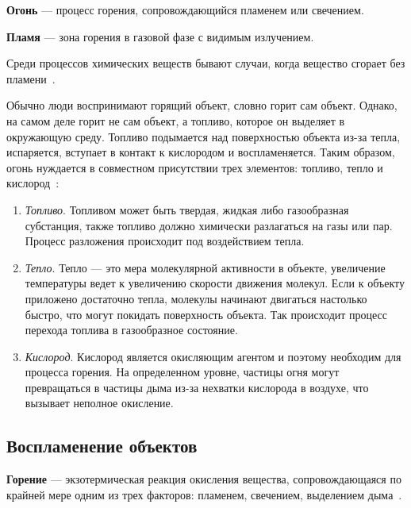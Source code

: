 \textbf{Огонь} --- процесс горения, сопровождающийся пламенем или свечением.

\textbf{Пламя} --- зона горения в газовой фазе с видимым излучением.

Среди процессов химических веществ бывают случаи, когда вещество сгорает без
пламени~\cite{WikiFire}.

Обычно люди воспринимают горящий объект, словно горит сам объект. Однако, на
самом деле горит не сам объект, а топливо, которое он выделяет в окружающую
среду. Топливо подымается над поверхностью объекта из-за тепла, испаряется,
вступает в контакт к кислородом и воспламеняется. Таким образом, огонь нуждается
в совместном присутствии трех элементов: топливо, тепло и
кислород~\cite{USArmy}:
\begin{enumerate}
    \item \emph{Топливо}. Топливом может быть твердая, жидкая либо газообразная
        субстанция, также топливо должно химически разлагаться на газы или
        пар. Процесс разложения происходит под воздействием тепла.
    \item \emph{Тепло}. Тепло --- это мера молекулярной активности в объекте,
        увеличение температуры ведет к увеличению скорости движения молекул.
        Если к объекту приложено достаточно тепла, молекулы начинают двигаться
        настолько быстро, что могут покидать поверхность объекта. Так происходит
        процесс перехода топлива в газообразное состояние.
    \item \emph{Кислород}. Кислород является окисляющим агентом и поэтому
        необходим для процесса горения. На определенном уровне, частицы огня
        могут превращаться в частицы дыма из-за нехватки кислорода в воздухе,
        что вызывает неполное окисление.
\end{enumerate}

\subsection{Воспламенение объектов}

\textbf{Горение} --- экзотермическая реакция окисления вещества,
сопровождающаяся по крайней мере одним из трех факторов: пламенем, свечением,
выделением дыма~\cite{383-87}.

